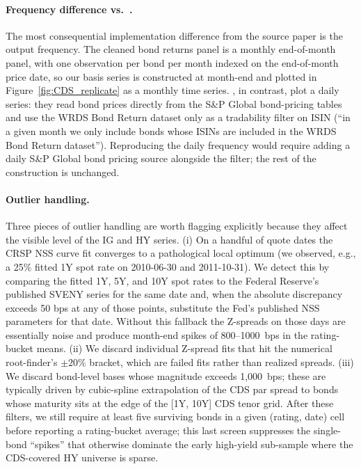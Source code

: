 \documentclass{article}
\begin{document}
\begin{appendices}
\paragraph{Frequency difference vs.~\citet{Siriwardane2021}.}
The most consequential implementation difference from the source paper is the
output frequency.  The cleaned bond returns panel is a monthly
end-of-month panel, with one observation per bond per month indexed on the
end-of-month price date, so our basis series is constructed at month-end and
plotted in Figure~\ref{fig:CDS_replicate} as a monthly time series.
\citet{Siriwardane2021}, in contrast, plot a daily series: they read
bond prices directly from the S\&P Global bond-pricing tables and use the WRDS
Bond Return dataset only as a tradability filter on ISIN (``in a given
month we only include bonds whose ISINs are included in the WRDS Bond
Return dataset''). Reproducing the daily frequency would require adding a
daily S\&P Global bond pricing source alongside the \citet{Dickerson2024} filter;
the rest of the construction is unchanged.

\paragraph{Outlier handling.}
Three pieces of outlier handling are worth flagging explicitly because they
affect the visible level of the IG and HY series. (i) On a handful of
quote dates the CRSP NSS curve fit converges to a pathological local
optimum (we observed, e.g., a 25\% fitted 1Y spot rate on 2010-06-30 and
2011-10-31).  We detect this by comparing the fitted 1Y, 5Y, and 10Y spot
rates to the Federal Reserve's published SVENY series for the same date
and, when the absolute discrepancy exceeds 50 bps at any of those points,
substitute the Fed's published NSS parameters for that date.  Without this
fallback the Z-spreads on those days are essentially noise and produce
month-end spikes of 800--1000~bps in the rating-bucket means. (ii) We
discard individual Z-spread fits that hit the numerical root-finder's
\(\pm 20\%\) bracket, which are failed fits rather than realized spreads.
(iii) We discard bond-level bases whose magnitude exceeds 1{,}000~bps;
these are typically driven by cubic-spline extrapolation of the CDS par
spread to bonds whose maturity sits at the edge of the [1Y, 10Y] CDS
tenor grid. After these filters, we still require at least five surviving
bonds in a given (rating, date) cell before reporting a rating-bucket
average; this last screen suppresses the single-bond ``spikes'' that
otherwise dominate the early high-yield sub-sample where the CDS-covered
HY universe is sparse.


\end{appendices}
\end{document}
